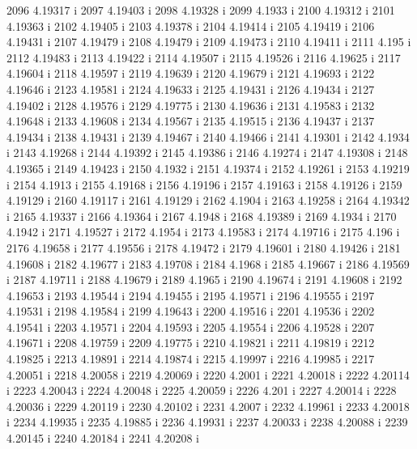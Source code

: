  2096  4.19317  i
 2097  4.19403  i
 2098  4.19328  i
 2099  4.1933  i
 2100  4.19312  i
 2101  4.19363  i
 2102  4.19405  i
 2103  4.19378  i
 2104  4.19414  i
 2105  4.19419  i
 2106  4.19431  i
 2107  4.19479  i
 2108  4.19479  i
 2109  4.19473  i
 2110  4.19411  i
 2111  4.195  i
 2112  4.19483  i
 2113  4.19422  i
 2114  4.19507  i
 2115  4.19526  i
 2116  4.19625  i
 2117  4.19604  i
 2118  4.19597  i
 2119  4.19639  i
 2120  4.19679  i
 2121  4.19693  i
 2122  4.19646  i
 2123  4.19581  i
 2124  4.19633  i
 2125  4.19431  i
 2126  4.19434  i
 2127  4.19402  i
 2128  4.19576  i
 2129  4.19775  i
 2130  4.19636  i
 2131  4.19583  i
 2132  4.19648  i
 2133  4.19608  i
 2134  4.19567  i
 2135  4.19515  i
 2136  4.19437  i
 2137  4.19434  i
 2138  4.19431  i
 2139  4.19467  i
 2140  4.19466  i
 2141  4.19301  i
 2142  4.1934  i
 2143  4.19268  i
 2144  4.19392  i
 2145  4.19386  i
 2146  4.19274  i
 2147  4.19308  i
 2148  4.19365  i
 2149  4.19423  i
 2150  4.1932  i
 2151  4.19374  i
 2152  4.19261  i
 2153  4.19219  i
 2154  4.1913  i
 2155  4.19168  i
 2156  4.19196  i
 2157  4.19163  i
 2158  4.19126  i
 2159  4.19129  i
 2160  4.19117  i
 2161  4.19129  i
 2162  4.1904  i
 2163  4.19258  i
 2164  4.19342  i
 2165  4.19337  i
 2166  4.19364  i
 2167  4.1948  i
 2168  4.19389  i
 2169  4.1934  i
 2170  4.1942  i
 2171  4.19527  i
 2172  4.1954  i
 2173  4.19583  i
 2174  4.19716  i
 2175  4.196  i
 2176  4.19658  i
 2177  4.19556  i
 2178  4.19472  i
 2179  4.19601  i
 2180  4.19426  i
 2181  4.19608  i
 2182  4.19677  i
 2183  4.19708  i
 2184  4.1968  i
 2185  4.19667  i
 2186  4.19569  i
 2187  4.19711  i
 2188  4.19679  i
 2189  4.1965  i
 2190  4.19674  i
 2191  4.19608  i
 2192  4.19653  i
 2193  4.19544  i
 2194  4.19455  i
 2195  4.19571  i
 2196  4.19555  i
 2197  4.19531  i
 2198  4.19584  i
 2199  4.19643  i
 2200  4.19516  i
 2201  4.19536  i
 2202  4.19541  i
 2203  4.19571  i
 2204  4.19593  i
 2205  4.19554  i
 2206  4.19528  i
 2207  4.19671  i
 2208  4.19759  i
 2209  4.19775  i
 2210  4.19821  i
 2211  4.19819  i
 2212  4.19825  i
 2213  4.19891  i
 2214  4.19874  i
 2215  4.19997  i
 2216  4.19985  i
 2217  4.20051  i
 2218  4.20058  i
 2219  4.20069  i
 2220  4.2001  i
 2221  4.20018  i
 2222  4.20114  i
 2223  4.20043  i
 2224  4.20048  i
 2225  4.20059  i
 2226  4.201  i
 2227  4.20014  i
 2228  4.20036  i
 2229  4.20119  i
 2230  4.20102  i
 2231  4.2007  i
 2232  4.19961  i
 2233  4.20018  i
 2234  4.19935  i
 2235  4.19885  i
 2236  4.19931  i
 2237  4.20033  i
 2238  4.20088  i
 2239  4.20145  i
 2240  4.20184  i
 2241  4.20208  i
